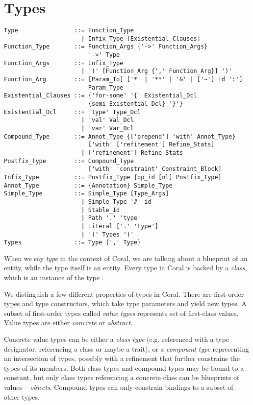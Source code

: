 
\chapter{Types}

\syntax\begin{lstlisting}
Type                ::= Function_Type
                      | Infix_Type [Existential_Clauses]
Function_Type       ::= Function_Args {'->' Function_Args} 
                        '->' Type
Function_Args       ::= Infix_Type
                      | '(' [Function_Arg {',' Function_Arg}] ')'
Function_Arg        ::= [Param_Io] ['*' | '**' | '&' | ['~'] id ':'] 
                        Param_Type
Existential_Clauses ::= {'for-some' '{' Existential_Dcl
                        {semi Existential_Dcl} '}'}
Existential_Dcl     ::= 'type' Type_Dcl
                      | 'val' Val_Dcl
                      | 'var' Var_Dcl
Compound_Type       ::= Annot_Type {['prepend'] 'with' Annot_Type} 
                        ['with' ['refinement'] Refine_Stats]
                      | ['refinement'] Refine_Stats
Postfix_Type        ::= Compound_Type 
                        ['with' 'constraint' Constraint_Block]
Infix_Type          ::= Postfix_Type {op_id [nl] Postfix_Type}
Annot_Type          ::= {Annotation} Simple_Type
Simple_Type         ::= Simple_Type [Type_Args]
                      | Simple_Type '#' id
                      | Stable_Id
                      | Path '.' 'type'
                      | Literal ['.' 'type']
                      | '(' Types ')'
Types               ::= Type {',' Type}
\end{lstlisting}

When we say \textit{type} in the context of Coral, we are talking about a blueprint of an entity, while the type itself is an entity. Every type in Coral is backed by a \textit{class}, which is an instance of the type \lstinline@Class@. 

We distinguish a few different properties of types in Coral. There are first-order types and type constructors, which take type parameters and yield new types. A subset of first-order types called \textit{value types} represents set of first-class values. Value types are either \textit{concrete} or \textit{abstract}. 

Concrete value types can be either a \textit{class type} (e.g. referenced with a type designator, referencing a class or maybe a trait), or a \textit{compound type} representing an intersection of types, possibly with a refinement that further constrains the types of its members. Both class types and compound types may be bound to a constant, but only class types referencing a concrete class can be blueprints of values -- \textit{objects}. Compound types can only constrain bindings to a subset of other types. 

